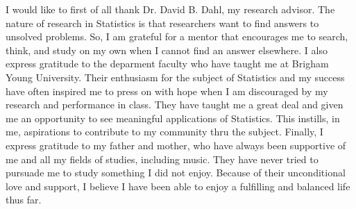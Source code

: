 I would like to first of all thank Dr. David B. Dahl, my research advisor. The nature of research in Statistics is that researchers want to find answers to unsolved problems. So, I am grateful for a mentor that encourages me to search, think, and study on my own when I cannot find an answer elsewhere.  I also express gratitude to the deparment faculty who have taught me at Brigham Young University. Their enthusiasm for the subject of Statistics and my success have often inspired me to press on with hope when I am discouraged by my research and performance in class. They have taught me a great deal and given me an opportunity to see meaningful applications of Statistics. This instills, in me, aspirations to contribute to my community thru the subject. Finally, I express gratitude to my father and mother, who have always been supportive of me and all my fields of studies, including music. They have never tried to pursuade me to study something I did not enjoy. Because of their unconditional love and support, I believe I have been able to enjoy a fulfilling and balanced life thus far.
